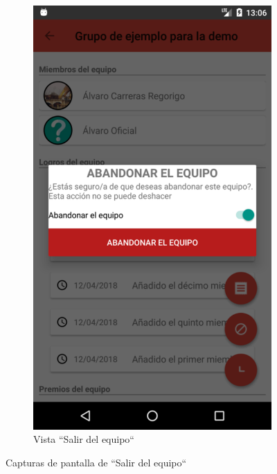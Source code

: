 \documentclass[twoside]{report}
\begin{document}
\begin{figure}[H]
\begin{center}
	\begin{subfigure}[t]{.3\linewidth}
		\includegraphics[scale=0.25]{images/userguide/22.png}
		\caption{Vista “Salir del equipo“}
	\end{subfigure}\hspace{5mm}%
\caption{Capturas de pantalla de “Salir del equipo“}
\end{center}
\end{figure}
\end{document}

